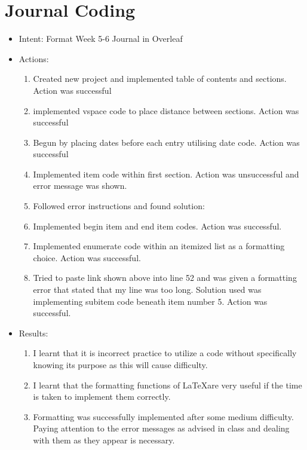 \documentclass{article}
\begin{document}
\section{Journal Coding}
\date{27/8/2019 12:52}
\begin{itemize}
\item{Intent: Format Week 5-6 Journal in Overleaf}
\item{Actions:}
\begin{enumerate}
    \item{Created new project and implemented table of contents and sections. Action was successful}
    \item{implemented vspace code to place distance between sections. Action was successful}
    \item{Begun by placing dates before each entry utilising date code. Action was successful}
    \item{Implemented item code within first section. Action was unsuccessful and error message was shown.}
    \item{Followed error instructions and found solution:}
    \item{Implemented begin item and end item codes. Action was successful.}
    \item{Implemented enumerate code within an itemized list as a formatting choice. Action was successful.}
    \item{Tried to paste link shown above into line 52 and was given a formatting error that stated that my line was too long. Solution used was implementing subitem code beneath item number 5. Action was successful.}
    \end{enumerate}
\item{Results:}
\begin{enumerate}
    \item{I learnt that it is incorrect practice to utilize a code without specifically knowing its purpose as this will cause difficulty.}
    \item{I learnt that the formatting functions of \LaTeX are very useful if the time is taken to implement them correctly.}
    \item{Formatting was successfully implemented after some medium difficulty. Paying attention to the error messages as advised in class and dealing with them as they appear is necessary.}
\end{enumerate}
\end{itemize}
\end{document}
